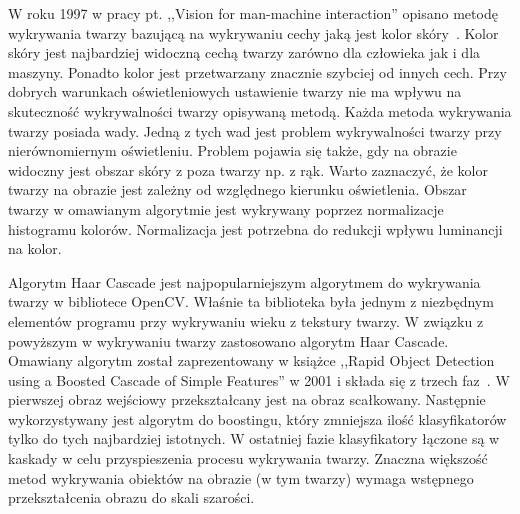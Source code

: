 \documentclass[a4paper,twoside,12pt]{book}
\begin{document}
    W roku 1997 w pracy pt. ,,Vision for man-machine interaction'' opisano metodę wykrywania twarzy bazującą na
    wykrywaniu cechy jaką jest kolor skóry~\cite{clowleyCoutaz}.
    Kolor skóry jest najbardziej widoczną cechą twarzy zarówno dla człowieka jak i dla maszyny.
    Ponadto kolor jest przetwarzany znacznie szybciej od innych cech.
    Przy dobrych warunkach oświetleniowych ustawienie twarzy nie ma wpływu na skuteczność wykrywalności twarzy
    opisywaną metodą.
    Każda metoda wykrywania twarzy posiada wady.
    Jedną z tych wad jest problem wykrywalności twarzy przy nierównomiernym oświetleniu.
    Problem pojawia się także, gdy na obrazie widoczny jest obszar skóry z poza twarzy np. z rąk.
    Warto zaznaczyć, że kolor twarzy na obrazie jest zależny od względnego kierunku oświetlenia.
    Obszar twarzy w omawianym algorytmie jest wykrywany poprzez normalizacje histogramu kolorów.
    Normalizacja jest potrzebna do redukcji wpływu luminancji na kolor.

    Algorytm Haar Cascade jest najpopularniejszym algorytmem do wykrywania twarzy w bibliotece OpenCV. Właśnie ta
    biblioteka była jednym z niezbędnym elementów programu przy wykrywaniu wieku z tekstury twarzy.
    W związku z powyższym w wykrywaniu twarzy zastosowano algorytm Haar Cascade.
    Omawiany algorytm został zaprezentowany w książce ,,Rapid Object Detection using a Boosted Cascade of Simple
    Features'' w 2001 i składa się z trzech faz~\cite{violaJones}.
    W pierwszej obraz wejściowy przekształcany jest na obraz scałkowany.
    Następnie wykorzystywany jest algorytm do boostingu, który zmniejsza ilość klasyfikatorów tylko do tych
    najbardziej istotnych.
    W ostatniej fazie klasyfikatory łączone są w kaskady w celu przyspieszenia procesu wykrywania twarzy.
    Znaczna większość metod wykrywania obiektów na obrazie (w tym twarzy) wymaga wstępnego przekształcenia obrazu do
    skali szarości.

\end{document}
